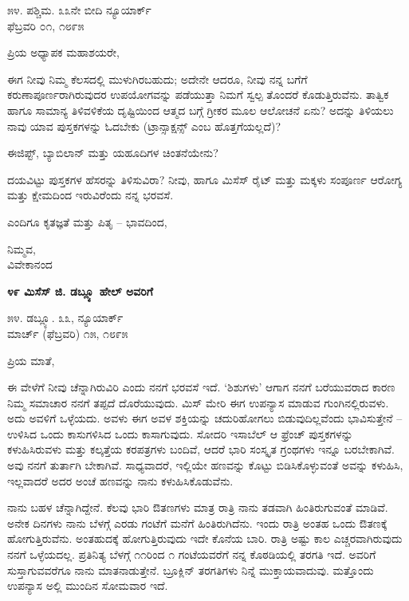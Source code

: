 \begin{flushright}
೫೪. ಪಶ್ಚಿಮ. ೩೩ನೇ ಬೀದಿ ನ್ಯೂಯಾರ್ಕ್\\ಫೆಬ್ರವರಿ ೦೧, ೧೮೯೫
\end{flushright}

ಪ್ರಿಯ ಅಧ್ಯಾಪಕ ಮಹಾಶಯರೇ,

ಈಗ ನೀವು ನಿಮ್ಮ ಕೆಲಸದಲ್ಲಿ ಮುಳುಗಿರಬಹುದು; ಅದೇನೇ ಆದರೂ, ನೀವು ನನ್ನ ಬಗೆಗೆ ಕರುಣಾಪೂರ್ಣರಾಗಿರುವುದರ ಉಪಯೋಗವನ್ನು ಪಡೆಯುತ್ತಾ ನಿಮಗೆ ಸ್ವಲ್ಪ ತೊಂದರೆ ಕೊಡುತ್ತಿರುವೆನು. ತಾತ್ವಿಕ ಹಾಗೂ ಸಾಮಾನ್ಯ ತಿಳಿವಳಿಕೆಯ ದೃಷ್ಟಿಯಿಂದ ಆತ್ಮದ ಬಗ್ಗೆ ಗ್ರೀಕರ ಮೂಲ ಆಲೋಚನೆ ಏನು? ಅದನ್ನು ತಿಳಿಯಲು ನಾವು ಯಾವ ಪುಸ್ತಕಗಳನ್ನು ಓದಬೇಕು (ಟ್ರಾನ್ಸಾಕ್ಷನ್ಸ್ ಎಂಬ ಹೊತ್ತಗೆಯಲ್ಲದೆ)?

ಈಜಿಪ್ಟ್, ಬ್ಯಾಬಿಲಾನ್ ಮತ್ತು ಯಹೂದಿಗಳ ಚಿಂತನೆಯೇನು?

ದಯವಿಟ್ಟು ಪುಸ್ತಕಗಳ ಹೆಸರನ್ನು ತಿಳಿಸುವಿರಾ? ನೀವು, ಹಾಗೂ ಮಿಸೆಸ್ ರೈಟ್ ಮತ್ತು ಮಕ್ಕಳು ಸಂಪೂರ್ಣ ಆರೋಗ್ಯ ಮತ್ತು ಕ್ಷೇಮದಿಂದ ಇರುವಿರೆಂದು ನನ್ನ ಭರವಸೆ.

ಎಂದಿಗೂ ಕೃತಜ್ಞತೆ ಮತ್ತು ಪಿತೃ – ಭಾವದಿಂದ,

\begin{flushright}
ನಿಮ್ಮವ,\\ವಿವೇಕಾನಂದ
\end{flushright}

\begin{center}
\textbf{೪೯ ಮಿಸೆಸ್ ಜಿ. ಡಬ್ಲ್ಯೂ ಹೇಲ್ ಅವರಿಗೆ}
\end{center}

\begin{flushright}
೫೪. ಡಬ್ಲ್ಯೂ. ೩೩, ನ್ಯೂಯಾರ್ಕ್\\ಮಾರ್ಚ್ (ಫೆಬ್ರವರಿ) ೧೫, ೧೮೯೫
\end{flushright}

ಪ್ರಿಯ ಮಾತೆ,

ಈ ವೇಳೆಗೆ ನೀವು ಚೆನ್ನಾಗಿರುವಿರಿ ಎಂದು ನನಗೆ ಭರವಸೆ ಇದೆ. ‘ಶಿಶುಗಳು’ ಆಗಾಗ ನನಗೆ ಬರೆಯುವರಾದ ಕಾರಣ ನಿಮ್ಮ ಸಮಾಚಾರ ನನಗೆ ತಪ್ಪದೆ ದೊರೆಯುವುದು. ಮಿಸ್ ಮೇರಿ ಈಗ ಉಪನ್ಯಾಸ ಮಾಡುವ ಗುಂಗಿನಲ್ಲಿರುವಳು. ಅದು ಅವಳಿಗೆ ಒಳ್ಳೆಯದು. ಅವಳು ಈಗ ಅವಳ ಶಕ್ತಿಯನ್ನು ಚದುರಿಹೋಗಲು ಬಿಡುವುದಿಲ್ಲವೆಂದು ಭಾವಿಸುತ್ತೇನೆ – ಉಳಿಸಿದ ಒಂದು ಕಾಸುಗಳಿಸಿದ ಒಂದು ಕಾಸಾಗುವುದು. ಸೋದರಿ ಇಸಾಬೆಲ್ ಆ ಫ್ರೆಂಚ್ ಪುಸ್ತಕಗಳನ್ನು ಕಳುಹಿಸಿರುವಳು ಮತ್ತು ಕಲ್ಕತ್ತೆಯ ಕರಪತ್ರಗಳು ಬಂದಿವೆ, ಆದರೆ ಭಾರಿ ಸಂಸ್ಕೃತ ಗ್ರಂಥಗಳು ಇನ್ನೂ ಬರಬೇಕಾಗಿವೆ. ಅವು ನನಗೆ ತುರ್ತಾಗಿ ಬೇಕಾಗಿವೆ. ಸಾಧ್ಯವಾದರೆ, ಇಲ್ಲಿಯೇ ಹಣವನ್ನು ಕೊಟ್ಟು ಬಿಡಿಸಿಕೊಳ್ಳುವಂತೆ ಅವನ್ನು ಕಳುಹಿಸಿ, ಇಲ್ಲವಾದರೆ ಅದರ ಅಂಚೆ ಹಣವನ್ನು ನಾನು ಕಳುಹಿಸಿಕೊಡುವೆನು.

ನಾನು ಬಹಳ ಚೆನ್ನಾಗಿದ್ದೇನೆ. ಕೆಲವು ಭಾರಿ ಔತಣಗಳು ಮಾತ್ರ ರಾತ್ರಿ ನಾನು ತಡವಾಗಿ ಹಿಂತಿರುಗುವಂತೆ ಮಾಡಿವೆ. ಅನೇಕ ದಿನಗಳು ನಾನು ಬೆಳಗ್ಗೆ ಎರಡು ಗಂಟೆಗೆ ಮನೆಗೆ ಹಿಂತಿರುಗಿದೆನು. ಇಂದು ರಾತ್ರಿ ಅಂತಹ ಒಂದು ಔತಣಕ್ಕೆ ಹೋಗುತ್ತಿರುವೆನು. ಅಂತಹುದಕ್ಕೆ ಹೋಗುತ್ತಿರುವುದು ಇದೇ ಕೊನೆಯ ಬಾರಿ. ರಾತ್ರಿ ಅಷ್ಟು ಕಾಲ ಎಚ್ಚರವಾಗಿರುವುದು ನನಗೆ ಒಳ್ಳೆಯದಲ್ಲ. ಪ್ರತಿನಿತ್ಯ ಬೆಳಗ್ಗೆ ೧೧ರಿಂದ ೧ ಗಂಟೆಯವರೆಗೆ ನನ್ನ ಕೊಠಡಿಯಲ್ಲಿ ತರಗತಿ ಇದೆ. ಅವರಿಗೆ ಸುಸ್ತಾಗುವವರೆಗೂ ನಾನು ಮಾತನಾಡುತ್ತೇನೆ. ಬ್ರೂಕ್ಲಿನ್ ತರಗತಿಗಳು ನಿನ್ನೆ ಮುಕ್ತಾಯವಾದುವು. ಮತ್ತೊಂದು ಉಪನ್ಯಾಸ ಅಲ್ಲಿ ಮುಂದಿನ ಸೋಮವಾರ ಇದೆ.

